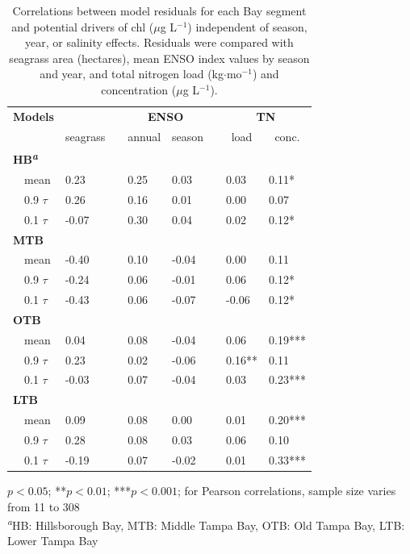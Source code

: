 \documentclass{svjour3}\usepackage[]{graphicx}\usepackage[]{color}
\newcommand{\mugl}{$\mu$g L$^{-1}$}
\begin{document}
\begin{table}[!tbp]
\caption{Correlations between model residuals for each Bay segment and potential drivers of \ac{chl} (\mugl) independent of season, year, or salinity effects. Residuals were compared with seagrass area (hectares), mean ENSO index values by season and year, and total nitrogen load (kg$\cdot$mo$^{-1}$) and concentration (\mugl).\label{tab:cormat}} 
\begin{center}
\begin{tabular}{llcllcll}
\hline\hline
\multicolumn{1}{l}{\bfseries Models}&\multicolumn{1}{c}{\bfseries }&\multicolumn{1}{c}{\bfseries }&\multicolumn{2}{c}{\bfseries ENSO}&\multicolumn{1}{c}{\bfseries }&\multicolumn{2}{c}{\bfseries TN}\tabularnewline
\cline{4-5} \cline{7-8}
\multicolumn{1}{l}{}&\multicolumn{1}{c}{seagrass}&\multicolumn{1}{c}{}&\multicolumn{1}{c}{annual}&\multicolumn{1}{c}{season}&\multicolumn{1}{c}{}&\multicolumn{1}{c}{load}&\multicolumn{1}{c}{conc.}\tabularnewline
\hline
{\bfseries HB\textsuperscript{\textit{a}}}&&&&&&&\tabularnewline
~~mean&0.23 &&0.25 &0.03 &&0.03 &0.11*\tabularnewline
~~0.9 $\tau$&0.26 &&0.16 &0.01 &&0.00 &0.07 \tabularnewline
~~0.1 $\tau$&-0.07 &&0.30 &0.04 &&0.02 &0.12*\tabularnewline
\hline
{\bfseries MTB}&&&&&&&\tabularnewline
~~mean&-0.40 &&0.10 &-0.04 &&0.00 &0.11 \tabularnewline
~~0.9 $\tau$&-0.24 &&0.06 &-0.01 &&0.06 &0.12*\tabularnewline
~~0.1 $\tau$&-0.43 &&0.06 &-0.07 &&-0.06 &0.12*\tabularnewline
\hline
{\bfseries OTB}&&&&&&&\tabularnewline
~~mean&0.04 &&0.08 &-0.04 &&0.06 &0.19***\tabularnewline
~~0.9 $\tau$&0.23 &&0.02 &-0.06 &&0.16**&0.11 \tabularnewline
~~0.1 $\tau$&-0.03 &&0.07 &-0.04 &&0.03 &0.23***\tabularnewline
\hline
{\bfseries LTB}&&&&&&&\tabularnewline
~~mean&0.09 &&0.08 &0.00 &&0.01 &0.20***\tabularnewline
~~0.9 $\tau$&0.28 &&0.08 &0.03 &&0.06 &0.10 \tabularnewline
~~0.1 $\tau$&-0.19 &&0.07 &-0.02 &&0.01 &0.33***\tabularnewline
\hline
\end{tabular}\end{center}

\footnotesize *$p<0.05$; **$p<0.01$; ***$p<0.001$; for Pearson correlations, sample size varies from 11 to 308\\\textsuperscript{\textit{a}}HB: Hillsborough Bay, MTB: Middle Tampa Bay, OTB: Old Tampa Bay, LTB: Lower Tampa Bay\end{table}
\end{document}
